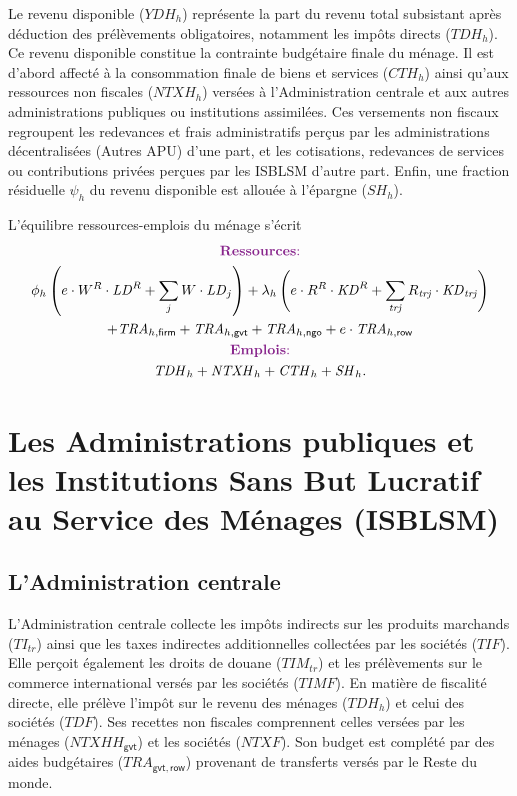 \documentclass[11pt,a4paper]{article}
\newcommand{\trj}{\mathit{trj}}
\newcommand{\gvt}{\mathsf{gvt}}
\newcommand{\firm}{\mathsf{firm}}
\newcommand{\ngo}{\mathsf{ngo}}
\newcommand{\row}{\mathsf{row}}
\newcommand{\CTH}{\mathit{CTH}}
\newcommand{\NTXHH}{\mathit{NTXHH}}
\newcommand{\KD}{\mathit{KD}}
\newcommand{\LD}{\mathit{LD}}
\newcommand{\SH}{\mathit{SH}}
\newcommand{\TI}{\mathit{TI}}
\newcommand{\TIF}{\mathit{TIF}}
\newcommand{\TIM}{\mathit{TIM}}
\newcommand{\TIMF}{\mathit{TIMF}}
\newcommand{\TRA}{\mathit{TRA}}
\newcommand{\TR}{\mathit{TRA}}
\newcommand{\NTXF}{\mathit{NTXF}}
\newcommand{\NTXH}{\mathit{NTXH}}
\newcommand{\TDH}{\mathit{TDH}}
\newcommand{\TDF}{\mathit{TDF}}
\newcommand{\YDH}{\mathit{YDH}}
\begin{document}
	Le revenu disponible ($\YDH_h$) représente la part du revenu total subsistant après déduction des prélèvements obligatoires, notamment les impôts directs ($\TDH_h$). Ce revenu disponible constitue la contrainte budgétaire finale du ménage. Il est d'abord affecté à la consommation finale de biens et services ($\CTH_h$) ainsi qu'aux ressources non fiscales ($\NTXH_h$) versées à l'Administration centrale et aux autres administrations publiques ou institutions assimilées. Ces versements non fiscaux regroupent les redevances et frais administratifs perçus par les administrations décentralisées (Autres APU) d'une part, et les cotisations, redevances de services ou contributions privées perçues par les ISBLSM d'autre part. Enfin, une fraction résiduelle $\psi_h$ du revenu disponible est allouée à l'épargne ($\SH_h$).
	
	L'équilibre ressources-emplois du ménage s'écrit	
	\begin{gather}
		\centerline{\textcolor{Fuchsia}{\textbf{Ressources}:}} \notag\\
		\phi_h \left(e\cdot W^R\cdot\LD^R + \sum_{j}^{}W\cdot \LD_j\right) + \lambda_h\left(e\cdot R^R\cdot\KD^R + \sum_{\trj}^{} R_{\trj}\cdot\KD_{\trj}\right) \notag\\
		+\TR_{h,\firm} + \TR_{h,\gvt} + \TR_{h,\ngo} + e\cdot\TR_{h,\row}\notag\\
		\centerline{\textcolor{Fuchsia}{\textbf{Emplois}:}} \notag\\
		\TDH_h + \NTXH_{h}  + \CTH_h + \SH_h. \notag
	\end{gather}
	
	\section{Les Administrations publiques et les Institutions Sans But Lucratif au Service des Ménages (ISBLSM)}
	\subsection{L'Administration centrale}
	
	L'Administration centrale collecte les impôts indirects sur les produits marchands ($\TI_{tr}$) ainsi que les taxes indirectes additionnelles collectées par les sociétés ($\TIF$). Elle perçoit également les droits de douane ($\TIM_{tr}$) et les prélèvements sur le commerce international versés par les sociétés ($\TIMF$). En matière de fiscalité directe, elle prélève l'impôt sur le revenu des ménages ($\TDH_h$) et celui des sociétés ($\TDF$). Ses recettes non fiscales comprennent celles versées par les ménages ($\NTXHH_{\gvt}$) et les sociétés ($\NTXF$). Son budget est complété par des aides budgétaires ($\TRA_{\gvt,\row}$) provenant de transferts versés par le Reste du monde.
	
\end{document}
